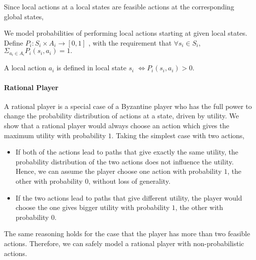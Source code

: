 
Since local actions at a local states are feasible actions at the corresponding global states,


We model probabilities of performing local actions starting at given local states. Define $P_i: S_i \times A_i \rightarrow [0,1]$ , with the requirement that
$\forall s_i \in S_i$, \(\Sigma_{a_i \in A_i} P_i(s_i,a_i) = 1.\)

A local action $a_i$ is defined in local state $s_i$ $ \iff P_i(s_i,a_i) > 0$.

\paragraph{Rational Player}
A rational player is a special case of a Byzantine player who has the full power to change the probability distribution of actions at a state, driven by utility. We show that a rational player would always choose an action which gives the maximum utility with probability $1$.
Taking the simplest case with two actions,
\begin{itemize}
	\item If both of the actions lead to paths that give exactly the same utility, the probability distribution of the two actions does not influence the utility. Hence, we can assume the player choose one action with probability $1$, the other with probability $0$, without loss of generality.
	\item If the two actions lead to paths that give different utility, the player would choose the one gives bigger utility with probability $1$, the other with probability $0$.
\end{itemize}
The same reasoning holds for the case that the player has more than two feasible actions.
Therefore, we can safely model a rational player with non-probabilistic actions.


